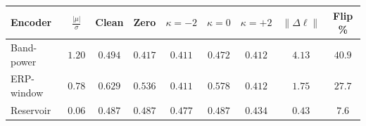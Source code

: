 \begin{tabular}{lcccccccc}
\toprule
Encoder & $\frac{|\mu|}{\sigma}$ & Clean & Zero & $\kappa{=}{-2}$ & $\kappa{=}0$ & $\kappa{=}{+2}$ & $\lVert\Delta\ell\rVert$ & Flip \% \\
\midrule
Band-power & $1.20$ & $0.494$ & $0.417$ & $0.411$ & $0.472$ & $0.412$ & $4.13$ & $40.9$ \\
ERP-window & $0.78$ & $0.629$ & $0.536$ & $0.411$ & $0.578$ & $0.412$ & $1.75$ & $27.7$ \\
Reservoir & $0.06$ & $0.487$ & $0.487$ & $0.477$ & $0.487$ & $0.434$ & $0.43$ & $7.6$ \\
\bottomrule
\end{tabular}
